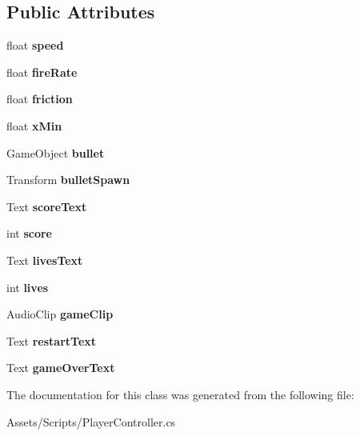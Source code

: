\subsection*{Public Attributes}
\begin{DoxyCompactItemize}
\item 
\mbox{\label{class_player_controller_a0928605583f0563cd84fe43119d336ec}} 
float {\bfseries speed}
\item 
\mbox{\label{class_player_controller_aec1e8f25c69ea198fe38f965307437a4}} 
float {\bfseries fire\+Rate}
\item 
\mbox{\label{class_player_controller_a22510e0221512fb7fe06808912fa1a55}} 
float {\bfseries friction}
\item 
\mbox{\label{class_player_controller_a373cbc1dfe44cb185a84422b4a56bf9b}} 
float {\bfseries x\+Min}
\item 
\mbox{\label{class_player_controller_a47d9b8f67993f190c8f170bc3f134ee6}} 
Game\+Object {\bfseries bullet}
\item 
\mbox{\label{class_player_controller_a45263a41dbdfe88658e0b58196aeba98}} 
Transform {\bfseries bullet\+Spawn}
\item 
\mbox{\label{class_player_controller_a8f1361a4354591db4e79c4e6609e0a88}} 
Text {\bfseries score\+Text}
\item 
\mbox{\label{class_player_controller_ac4f30954818a6c7d0e344721a0342fec}} 
int {\bfseries score}
\item 
\mbox{\label{class_player_controller_a4693ac0aaa4ce93171a7b58a4b7d8117}} 
Text {\bfseries lives\+Text}
\item 
\mbox{\label{class_player_controller_a011e869f64df3168d919fa6f41d58614}} 
int {\bfseries lives}
\item 
\mbox{\label{class_player_controller_a6206943367033fb9307accaf27f9a1ef}} 
Audio\+Clip {\bfseries game\+Clip}
\item 
\mbox{\label{class_player_controller_a5dacc07bd5240b4d30337caeb89d6e02}} 
Text {\bfseries restart\+Text}
\item 
\mbox{\label{class_player_controller_ad22c814018c51eab731676920276c38d}} 
Text {\bfseries game\+Over\+Text}
\end{DoxyCompactItemize}


The documentation for this class was generated from the following file\+:\begin{DoxyCompactItemize}
\item 
Assets/\+Scripts/Player\+Controller.\+cs\end{DoxyCompactItemize}
